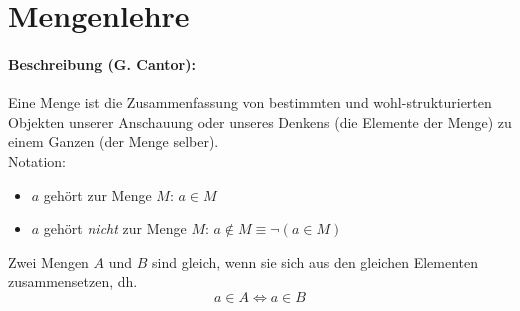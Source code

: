 %

\section{Mengenlehre}
\paragraph{Beschreibung (G. Cantor):}\glqq Eine Menge ist die Zusammenfassung von bestimmten und wohl-strukturierten Objekten unserer Anschauung oder unseres Denkens
(die Elemente der Menge) zu einem Ganzen (der Menge selber).\grqq\\
Notation:
\begin{itemize}
\item $a$ gehört zur Menge $M$: $a\in M$
\item $a$ gehört \emph{nicht} zur Menge $M$: $a\notin M\equiv \neg(a\in M)$
\end{itemize}
Zwei Mengen $A$ und $B$ sind gleich, wenn sie sich aus den gleichen Elementen zusammensetzen, dh.
\[
a\in A \Leftrightarrow a\in B
\]

